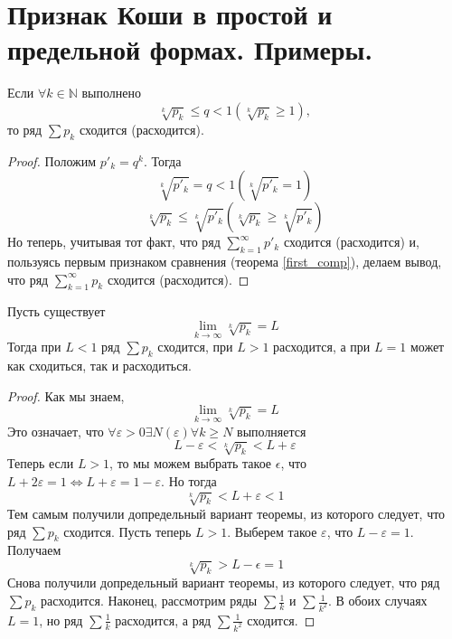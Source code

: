 \section{Признак Коши в простой и предельной формах. Примеры.}
\begin{theorem}
    Если $\forall k \in \mathbb{N}$ выполнено
    \[
        \sqrt[k]{p_k} \leqslant q < 1
        \left(
            \sqrt[k]{p_k} \geqslant 1
        \right)
        ,
    \] то ряд $\sum p_k$ сходится (расходится).
    \begin{proof}
        Положим $p'_k = q^k$. Тогда
        \[
            \sqrt[k]{p'_k} = q < 1
            \left(
                \sqrt[k]{p'_k} = 1
            \right)
        \]
        \[
            \sqrt[k]{p_k} \leqslant
            \sqrt[k]{p'_k}
            \left(
                \sqrt[k]{p_k} \geqslant
                \sqrt[k]{p'_k}
            \right)
        \]
        Но теперь, учитывая тот факт, что ряд $\sum_{k=1}^{\infty} p'_k$ сходится (расходится) и, пользуясь первым признаком сравнения (теорема \ref{first_comp}), делаем вывод, что ряд $\sum_{k=1}^{\infty} p_k$ сходится (расходится).
    \end{proof}
\end{theorem}

\begin{theorem}
    Пусть существует
    \[
        \lim_{k \to \infty} \sqrt[k]{p_k} = L
    \]
    Тогда при $L < 1$ ряд $\sum p_k$ сходится, при $L > 1$ расходится, а при $L = 1$ может как сходиться, так и расходиться.
    \begin{proof}
        Как мы знаем,
        \[
            \lim_{k \to \infty} \sqrt[k]{p_k} = L
        \]
        Это означает, что $\forall \varepsilon > 0 \exists N(\varepsilon) \forall k \geqslant N$ выполняется
        \[
            L - \varepsilon < \sqrt[k]{p_k} < L + \varepsilon
        \]
        Теперь если $L > 1$, то мы можем выбрать такое $\epsilon$, что $L + 2 \varepsilon = 1 \Leftrightarrow L + \varepsilon = 1 - \varepsilon$. Но тогда
        \[
            \sqrt[k]{p_k} < L + \varepsilon < 1
        \]
        Тем самым получили допредельный вариант теоремы, из которого следует, что ряд $\sum p_k$ сходится.
        \newline
        Пусть теперь $L > 1$. Выберем такое $\varepsilon$, что $L - \varepsilon = 1$. Получаем
        \[
            \sqrt[k]{p_k} > L - \epsilon = 1
        \]
        Снова получили допредельный вариант теоремы, из которого следует, что ряд $\sum p_k$ расходится.
        \newline
        Наконец, рассмотрим ряды $\sum \frac{1}{k}$ и $\sum \frac{1}{k^2}$. В обоих случаях $L=1$, но ряд $\sum \frac{1}{k}$ расходится, а ряд $\sum \frac{1}{k^2}$ сходится.
    \end{proof}
\end{theorem}
